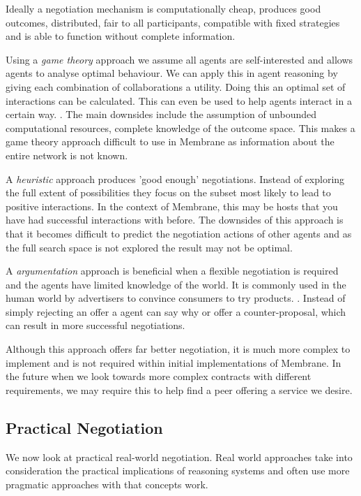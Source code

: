 \documentclass[11pt, a4paper, twoside]{report}
\begin{document}
Ideally a negotiation mechanism is computationally cheap, produces good outcomes, distributed, fair to all participants, compatible with fixed strategies and is able to function without complete information. \citep{rahwan2005interest}

Using a \emph{game theory} approach we assume all agents are self-interested and allows agents to analyse optimal behaviour. \citep{osborne1994course} We can apply this in agent reasoning by giving each combination of collaborations a utility. Doing this an optimal set of interactions can be calculated. This can even be used to help agents interact in a certain way. \citep{varian1995economic}. The main downsides include the assumption of unbounded computational resources, complete knowledge of the outcome space. \citep{rahwan2005interest} This makes a game theory approach difficult to use in Membrane as information about the entire network is not known.

A \emph{heuristic} approach produces 'good enough' negotiations. Instead of exploring the full extent of possibilities they focus on the subset most likely to lead to positive interactions. In the context of Membrane, this may be hosts that you have had successful interactions with before. The downsides of this approach is that it becomes difficult to predict the negotiation actions of other agents and as the full search space is not explored the result may not be optimal. \citep{jennings2001automated}

A \emph{argumentation} approach is beneficial when a flexible negotiation is required and the agents have limited knowledge of the world. It is commonly used in the human world by advertisers to convince consumers to try products. \citep{slade2002reasons}. Instead of simply rejecting an offer a agent can say why or offer a counter-proposal, which can result in more successful negotiations.

Although this approach offers far better negotiation, it is much more complex to implement and is not required within initial implementations of Membrane. In the future when we look towards more complex contracts with different requirements, we may require this to help find a peer offering a service we desire.

\subsection{Practical Negotiation}

We now look at practical real-world negotiation. Real world approaches take into consideration the practical implications of reasoning systems and often use more pragmatic approaches with that concepts work.
\end{document}
